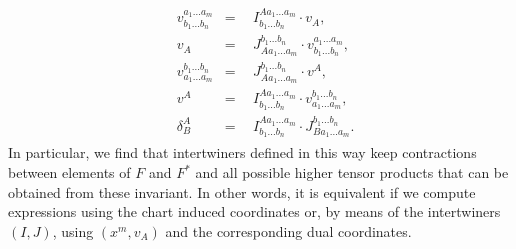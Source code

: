 \documentclass[a4paper,12pt, DIV=14, BCOR=5mm, twoside, headsepline, numbers=noenddot]{scrbook}
\begin{document}
\begin{align} \label{interRel}
    \begin{aligned}
    & v^{a_1 ... a_m}_{b_1 ... b_n} & = & \ \ I^{A a_1 ... a_m}_{b_1 ... b_n} \cdot v_{A},\\  
    & v_A & = & \ \ J^{b_1 ... b_n}_{A a_1 ... a_m} \cdot v^{a_1 ... a_m}_{b_1 ... b_n}, \\
    & v^{b_1 ... b_n}_{a_1 ... a_m} & = & \ \  J^{b_1 ... b_n}_{A a_1 ... a_m} \cdot v^A, \\ 
    & v^A & = & \ \  I^{A a_1 ... a_m}_{b_1 ... b_n} \cdot v^{b_1 ... b_n}_{a_1 ... a_m}, \\
    & \delta^A _ B & = & \ \   I^{A a_1 ... a_m}_{b_1 ... b_n} \cdot J^{b_1 ... b_n}_{B a_1 ... a_m}.  
    \end{aligned}
\end{align}
In particular, we find that intertwiners defined in this way keep contractions between elements of $F$ and $F^{\ast}$ and all possible higher tensor products that can be obtained from these invariant. In other words, it is equivalent if we compute expressions using the chart induced coordinates or, by means of the intertwiners $(I,J)$, using $(x^m, v_A)$ and the corresponding dual coordinates.
\end{document}
